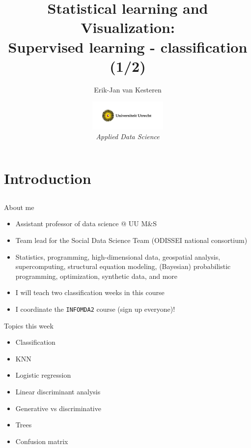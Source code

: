 \documentclass[xcolor=table,aspectratio=169]{beamer}
\title[Supervised learning-classification (1/2)]{
	{\LARGE{Statistical learning and Visualization}:\\\large{Supervised learning - classification (1/2)}}
}
\institute{
	\footnotesize Department of Methodology and Statistics\\
}
\author[van Kesteren]{Erik-Jan van Kesteren}
\date{\includegraphics[height=1.5cm]{pics/uu-logo.png}\\
	
	\footnotesize{\emph{Applied Data Science}}}
\begin{document}
\begin{frame}
\maketitle
\end{frame}

\begin{frame}
  \tableofcontents
\end{frame}

\section{Introduction}\subsection{}

\begin{frame}{About me}
	\begin{itemize}
		\item Assistant professor of data science @ UU M\&S
		\item Team lead for the Social Data Science Team (ODISSEI national consortium)
		\item Statistics, programming, high-dimensional data, geospatial analysis, supercomputing, structural equation modeling, (Bayesian) probabilistic programming, optimization, synthetic data, and more
		\item I will teach two classification weeks in this course
		\item I coordinate the \texttt{INFOMDA2} course (sign up everyone)!
	\end{itemize}
\end{frame}

\begin{frame}{Topics this week}
	\begin{itemize}
		\item Classification
		\item KNN
		\item Logistic regression
		\item Linear discriminant analysis
		\item Generative vs discriminative
		\item Trees
		\item Confusion matrix
	\end{itemize}
\end{frame}
\end{document}
